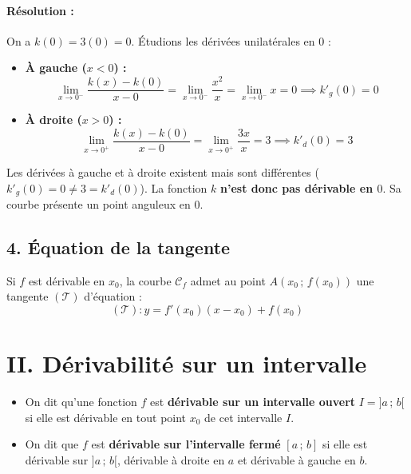 \documentclass[12pt,a4paper]{article}
\begin{document}
\paragraph{Résolution :}
On a $k(0) = 3(0) = 0$. Étudions les dérivées unilatérales en $0$ :
\begin{itemize}
    \item \textbf{À gauche ($x < 0$) :}
    \[
    \lim_{x \to 0^-} \frac{k(x) - k(0)}{x - 0} = \lim_{x \to 0^-} \frac{x^2}{x} = \lim_{x \to 0^-} x = 0 \implies k'_g(0) = 0
    \]
    \item \textbf{À droite ($x > 0$) :}
    \[
    \lim_{x \to 0^+} \frac{k(x) - k(0)}{x - 0} = \lim_{x \to 0^+} \frac{3x}{x} = 3 \implies k'_d(0) = 3
    \]
\end{itemize}
Les dérivées à gauche et à droite existent mais sont différentes ($k'_g(0) = 0 \neq 3 = k'_d(0)$). La fonction $k$ \textbf{n'est donc pas dérivable en $0$}. Sa courbe présente un point anguleux en $0$.

\subsection*{\color{myred}4. Équation de la tangente}

\begin{tcolorbox}[colback=gray!10!white,colframe=black,title=\textbf{Propriété : Équation de la tangente}]
Si $f$ est dérivable en $x_0$, la courbe $\mathcal{C}_f$ admet au point $A(x_0 \,;\, f(x_0))$ une tangente $(\mathcal{T})$ d'équation :
\[
(\mathcal{T}) : y = f'(x_0)(x - x_0) + f(x_0)
\]
\end{tcolorbox}


\section*{\color{myred}II. Dérivabilité sur un intervalle}

\begin{tcolorbox}[colback=red!5!white,colframe=myred,title=\textbf{Définition : Dérivabilité sur un intervalle}]
\begin{itemize}
    \item On dit qu'une fonction $f$ est \textbf{dérivable sur un intervalle ouvert} $I = ]a \,;\, b[$ si elle est dérivable en tout point $x_0$ de cet intervalle $I$.
    \item On dit que $f$ est \textbf{dérivable sur l'intervalle fermé} $[a \,;\, b]$ si elle est dérivable sur $]a \,;\, b[$, dérivable à droite en $a$ et dérivable à gauche en $b$.
\end{itemize}
\end{tcolorbox}
\end{document}
